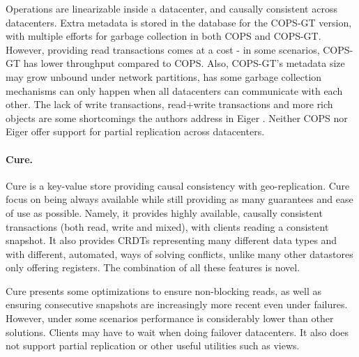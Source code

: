 Operations are linearizable inside a datacenter, and causally consistent across datacenters.
Extra metadata is stored in the database for the COPS-GT version, with multiple efforts for garbage collection in both COPS and COPS-GT.
However, providing read transactions comes at a cost - in some scenarios, COPS-GT has lower throughput compared to COPS.
Also, COPS-GT's metadata size may grow unbound under network partitions, has some garbage collection mechanisms can only happen when all datacenters can communicate with each other.
The lack of write transactions, read+write transactions and more rich objects are some shortcomings the authors address in Eiger \cite{eiger}.
Neither COPS nor Eiger offer support for partial replication across datacenters.

\paragraph{Cure.} Cure \cite{cure} is a key-value store providing causal consistency with geo-replication.
Cure focus on being always available while still providing as many guarantees and ease of use as possible.
Namely, it provides highly available, causally consistent transactions (both read, write and mixed), with clients reading a consistent snapshot.
It also provides CRDTs representing many different data types and with different, automated, ways of solving conflicts, unlike many other datastores only offering registers.
The combination of all these features is novel.

Cure presents some optimizations to ensure non-blocking reads, as well as ensuring consecutive snapshots are increasingly more recent even under failures.
However, under some scenarios performance is considerably lower than other solutions.
Clients may have to wait when doing failover datacenters.
It also does not support partial replication or other useful utilities such as views.	

